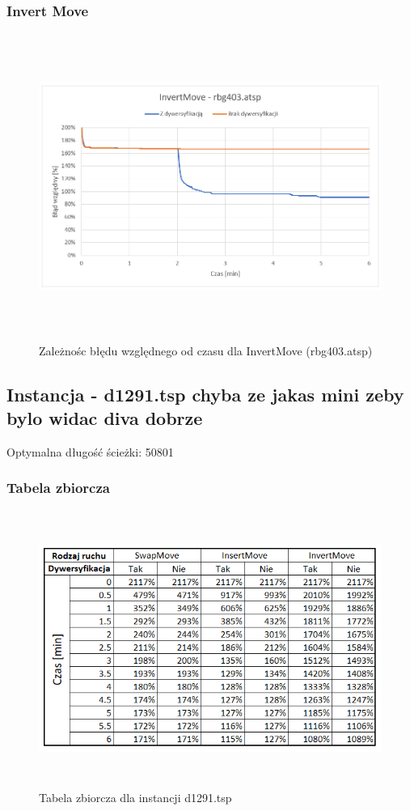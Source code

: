 \documentclass[a4paper,11pt]{article}
\begin{document}
\subsubsection{Invert Move}
\begin{figure}[H]
\centering
\includegraphics[height=10cm]{InvertMove403.PNG}
\caption{Zależnośc błędu względnego od czasu dla InvertMove (rbg403.atsp)}
\end{figure}

\subsection{Instancja - d1291.tsp chyba ze jakas mini zeby bylo widac diva dobrze}

Optymalna długość ścieżki: 50801

\subsubsection{Tabela zbiorcza}

\begin{figure}[H]
\centering
\includegraphics[height=9cm]{1291.PNG}
\caption{Tabela zbiorcza dla instancji d1291.tsp}
\end{figure}
\end{document}
